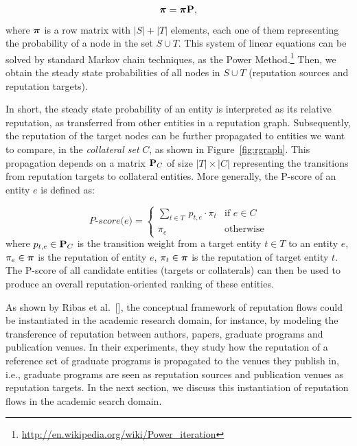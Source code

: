 \documentclass[msc]{ppgccufmg}
\begin{document}
\begin{align}
\label{eq:ggP}
    {\mbox{\boldmath $\pi$}} = {\mbox{\boldmath $\pi$}} {\bf P},
\end{align}
\noindent where ${\mbox{\boldmath $\pi$}}$ is a row matrix with $|S|+|T|$ elements, each one of them representing the probability of a node in the set $S \cup T$. This system of linear equations can be solved by standard Markov chain techniques, as the Power Method.\footnote{\url{http://en.wikipedia.org/wiki/Power_iteration}} Then, we obtain the steady state probabilities of all nodes in $S \cup T$ (reputation sources and reputation targets).

In short, the steady state probability of an entity is interpreted as its relative reputation, as transferred from other entities in a reputation graph. Subsequently, the reputation of the target nodes can be further propagated to entities we want to compare, in the \textit{collateral set} $C$, as shown in Figure~\ref{fig:rgraph}. 
%
%
This propagation depends on a matrix ${\bf P}_C$ of size $|T|\times |C|$ representing the transitions from reputation targets to collateral entities. 
More generally, the P-score of an entity $e$ is defined as:

\begin{equation}\label{eq:pscore}
    \textit{P-score(e)} = \begin{cases}
        \displaystyle\sum\limits_{t \in T} \ p_{t,e} \cdot \pi_t & \text{if $e \in C$}\\
        \pi_e &\text{otherwise}
    \end{cases}
\end{equation}
where $p_{t,e} \in {\bf P}_C$ is the transition weight from a target entity $t \in T$ to an entity $e$, $\pi_e \in {\mbox{\boldmath $\pi$}}$ is the reputation of entity $e$, $\pi_t \in {\mbox{\boldmath $\pi$}}$ is the reputation of target entity $t$. The P-score of all candidate entities (targets or collaterals) can then be used to produce an overall reputation-oriented ranking of these entities.

As shown by Ribas et al.~[\citeyear{ribas2015random}], the conceptual framework of reputation flows could be instantiated in the academic research domain, for instance, by modeling the transference of reputation between authors, papers, graduate programs and publication venues. In their experiments, they study how the reputation of a reference set of graduate programs is propagated to the venues they publish in, i.e., graduate programs are seen as reputation sources and publication venues as reputation targets. In the next section, we discuss this instantiation of reputation flows in the academic search domain.
\end{document}
